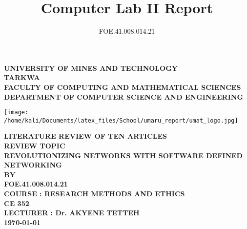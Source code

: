 \documentclass[12pt,a4paper]{report}
\author{FOE.41.008.014.21}
\title{Computer Lab II Report}
\newcommand{\lecturer}{Dr. AKYENE TETTEH}
\newcommand{\school}{
	\centering
	\textbf{\large UNIVERSITY OF MINES AND TECHNOLOGY \\TARKWA
	\vspace{1cm}	\\FACULTY OF COMPUTING AND MATHEMATICAL SCIENCES
	DEPARTMENT OF COMPUTER SCIENCE AND ENGINEERING
	}
}
\newcommand{\rpaim}{
	\centering

 \textbf{\large LITERATURE REVIEW OF TEN ARTICLES \\ REVIEW TOPIC\\REVOLUTIONIZING NETWORKS WITH SOFTWARE DEFINED NETWORKING \\BY \\FOE.41.008.014.21\\COURSE : RESEARCH METHODS AND ETHICS \\CE 352\\ LECTURER : \lecturer \\ \vspace{1.5cm} \today }}
\begin{document}
	\begin{titlepage}
		\school
		\vspace{2cm}
		\begin{center}
			\texttt{[image: /home/kali/Documents/latex\_files/School/umaru\_report/umat\_logo.jpg]} %
		\end{center}
		\vspace{1cm}
		\rpaim

		\vfill

	\end{titlepage}
	

	

\end{document}
